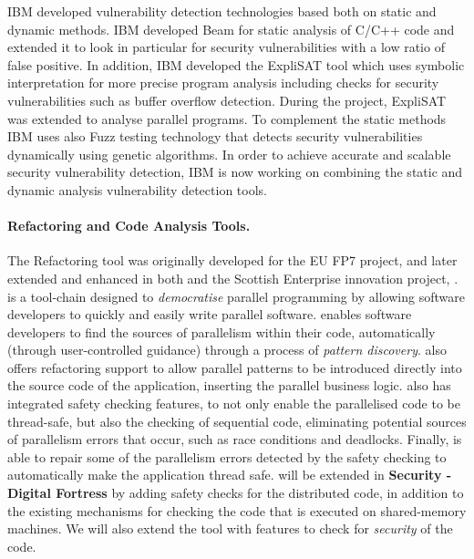 \documentclass[a4paper,11pt]{article}
\newcommand{\project}[1]{\textbf{#1}\xspace}
\newcommand{\SECURITY}{\project{Security - Digital Fortress}}
\newcommand{\TheProject}{\SECURITY}
\begin{document}
IBM developed vulnerability detection technologies based both on static and dynamic methods. IBM developed Beam for static analysis of C/C++ code and extended it to look in particular for security vulnerabilities with a low ratio of false positive. In addition, IBM developed the ExpliSAT tool which uses symbolic interpretation for more precise program analysis including checks for security vulnerabilities such as buffer overflow detection. During the \rephrase{} project, ExpliSAT was extended to analyse parallel programs. To complement the static methods IBM uses also Fuzz testing technology that detects security vulnerabilities dynamically using genetic algorithms. In order to achieve accurate and scalable security vulnerability detection, IBM is now working on combining the static and dynamic analysis vulnerability detection tools.     

\paragraph{\SAshort{} \paraformance Refactoring and Code Analysis Tools.}


The \paraformance Refactoring tool was originally developed for the EU FP7 \paraphrase{} project, and later extended and enhanced in both \rephrase{} and the Scottish Enterprise innovation project, \paraformance{}. 
\paraformance is a tool-chain designed to \emph{democratise} parallel programming by allowing software developers to quickly and easily write parallel software. \paraformance enables software developers to find the sources of parallelism within their code, automatically (through user-controlled guidance) through a process of \emph{pattern discovery}. \paraformance also offers refactoring support to allow parallel patterns to be introduced directly into the source code of the application, inserting the parallel business logic. \paraformance also has integrated safety checking features, to not only enable  the parallelised code to be thread-safe, but also the checking of sequential code, eliminating potential sources of parallelism errors that occur, such as race conditions and deadlocks. Finally, \paraformance is able to repair some of the parallelism errors detected by the safety checking to automatically make the application thread safe. \paraformance will be extended in \TheProject{} by adding safety checks for the distributed code, in addition to the existing mechanisms for checking the code that is executed on shared-memory machines. We will also extend the tool with features to check for \emph{security} of the code. 
\end{document}
